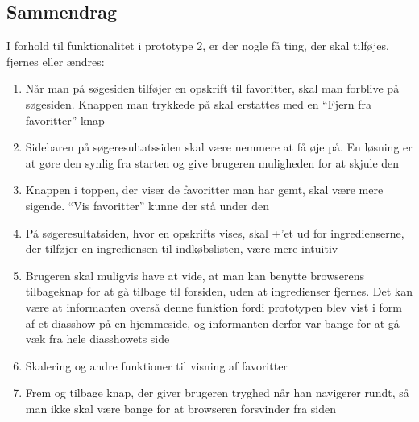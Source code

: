 \subsection{Sammendrag}

I forhold til funktionalitet i prototype 2, er der nogle få ting, der skal tilføjes, fjernes eller ændres:

\begin{enumerate}[noitemsep]
\item Når man på søgesiden tilføjer en opskrift til favoritter, skal man forblive på søgesiden. Knappen man trykkede på skal erstattes med en ``Fjern fra favoritter''-knap
\item Sidebaren på søgeresultatssiden skal være nemmere at få øje på. En løsning er at gøre den synlig fra starten og give brugeren muligheden for at skjule den
\item Knappen i toppen, der viser de favoritter man har gemt, skal være mere sigende. ``Vis favoritter'' kunne der stå under den
\item På søgeresultatsiden, hvor en opskrifts vises, skal +’et ud for ingredienserne, der tilføjer en ingrediensen til indkøbslisten, være mere intuitiv
\item Brugeren skal muligvis have at vide, at man kan benytte browserens tilbageknap for at gå tilbage til forsiden, uden at ingredienser fjernes. Det kan være at informanten overså denne funktion fordi prototypen blev vist i form af et diasshow på en hjemmeside, og informanten derfor var bange for at gå væk fra hele diasshowets side
\item Skalering og andre funktioner til visning af favoritter
\item Frem og tilbage knap, der giver brugeren tryghed når han navigerer rundt, så man ikke skal være bange for at browseren forsvinder fra siden
\end{enumerate}
